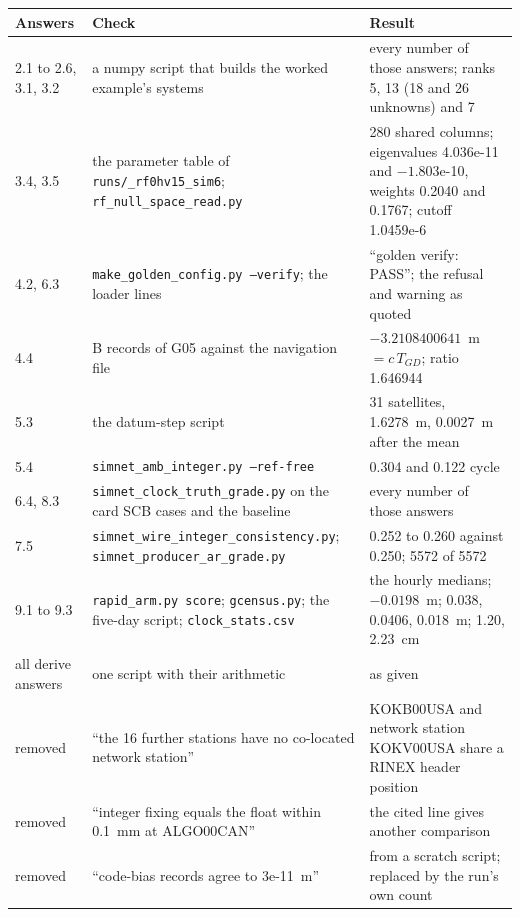 \documentclass[11pt,letterpaper]{article}
\begin{document}
\begin{center}\footnotesize
\begin{tabular}{@{}p{2.0cm}p{6.6cm}p{6.2cm}@{}}
\toprule
Answers & Check & Result \\
\midrule
2.1 to 2.6, 3.1, 3.2 & a numpy script that builds the worked example's systems & every number of those answers; ranks 5, 13 (18 and 26 unknowns) and 7 \\
3.4, 3.5 & the parameter table of \texttt{runs/\_rf0hv15\_sim6}; \texttt{rf\_null\_space\_read.py} & 280 shared columns; eigenvalues 4.036e-11 and $-1.803$e-10, weights 0.2040 and 0.1767; cutoff 1.0459e-6 \\
4.2, 6.3 & \texttt{make\_golden\_config.py --verify}; the loader lines & ``golden verify: PASS''; the refusal and warning as quoted \\
4.4 & B records of G05 against the navigation file & $-3.2108400641$~m $= c\,T_{GD}$; ratio 1.646944 \\
5.3 & the datum-step script & 31 satellites, 1.6278~m, 0.0027~m after the mean \\
5.4 & \texttt{simnet\_amb\_integer.py --ref-free} & 0.304 and 0.122 cycle \\
6.4, 8.3 & \texttt{simnet\_clock\_truth\_grade.py} on the card SCB cases and the baseline & every number of those answers \\
7.5 & \texttt{simnet\_wire\_integer\_consistency.py}; \texttt{simnet\_producer\_ar\_grade.py} & 0.252 to 0.260 against 0.250; 5572 of 5572 \\
9.1 to 9.3 & \texttt{rapid\_arm.py score}; \texttt{gcensus.py}; the five-day script; \texttt{clock\_stats.csv} & the hourly medians; $-0.0198$~m; 0.038, 0.0406, 0.018~m; 1.20, 2.23~cm \\
all derive answers & one script with their arithmetic & as given \\
\midrule
removed & ``the 16 further stations have no co-located network station'' & KOKB00USA and network station KOKV00USA share a RINEX header position \\
removed & ``integer fixing equals the float within 0.1~mm at ALGO00CAN'' & the cited line gives another comparison \\
removed & ``code-bias records agree to 3e-11~m'' & from a scratch script; replaced by the run's own count \\
\bottomrule
\end{tabular}
\end{center}

\printbibliography
\end{document}
